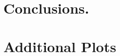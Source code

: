 \documentclass[11pt]{amsart}
\theoremstyle{plain}
\theoremstyle{definition}
\theoremstyle{remark}
\begin{document}








\section{Conclusions.}
\label{sec:conclusions}






\newpage
\appendix

\section{Additional Plots}
\end{document}
